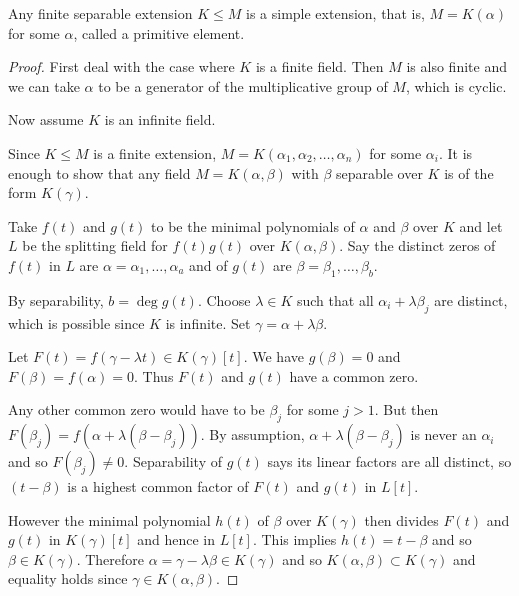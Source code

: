 \documentclass{article}
\begin{document}

\begin{nthm}\label{thm:2.17}
    Any finite separable extension $K \leq M$ is a simple extension, that is, $M = K(\alpha)$ for some $\alpha$, called a primitive element.
\end{nthm}
\begin{proof}
    First deal with the case where $K$ is a finite field. Then $M$ is also finite and we can take $\alpha$ to be a generator of the multiplicative group of $M$, which is cyclic.

    Now assume $K$ is an infinite field.

    Since $K\leq M$ is a finite extension, $M = K(\alpha_1, \alpha_2, \dotsc, \alpha_n)$ for some $\alpha_i$.
    It is enough to show that any field $M = K(\alpha, \beta)$ with $\beta$ separable over $K$ is of the form $K(\gamma)$.

    Take $f(t)$ and $g(t)$ to be the minimal polynomials of $\alpha$ and $\beta$ over $K$ and let $L$ be the splitting field for $f(t) g(t)$ over $K(\alpha, \beta)$.
    Say the distinct zeros of $f(t)$ in $L$ are $\alpha = \alpha_1, \dotsc, \alpha_a$ and of $g(t)$ are $\beta = \beta_1, \dotsc, \beta_b$.

    By separability, $b = \deg g(t)$.
    Choose $\lambda \in K$ such that all $\alpha_i + \lambda \beta_j$ are distinct, which is possible since $K$ is infinite.
    Set $\gamma = \alpha + \lambda \beta$.

    Let $F(t) = f(\gamma - \lambda t) \in K(\gamma)[t]$. We have $g(\beta) = 0$ and $F(\beta) = f(\alpha) = 0$. Thus $F(t)$ and $g(t)$ have a common zero.

    Any other common zero would have to be $\beta_j$ for some $j > 1$. But then $F(\beta_j) = f(\alpha + \lambda(\beta - \beta_j))$.
    By assumption, $\alpha + \lambda(\beta - \beta_j)$ is never an $\alpha_i$ and so $F(\beta_j) \neq 0$.
    Separability of $g(t)$ says its linear factors are all distinct, so $(t-\beta)$ is a highest common factor of $F(t)$ and $g(t)$ in $L[t]$.

    However the minimal polynomial $h(t)$ of $\beta$ over $K(\gamma)$ then divides $F(t)$ and $g(t)$ in $K(\gamma)[t]$ and hence in $L[t]$. This implies $h(t) = t - \beta$ and so $\beta \in K(\gamma)$.
    Therefore $\alpha = \gamma - \lambda \beta \in K(\gamma)$ and so $K(\alpha, \beta) \subset K(\gamma)$ and equality holds since $\gamma \in K(\alpha, \beta)$.
\end{proof}
\end{document}

